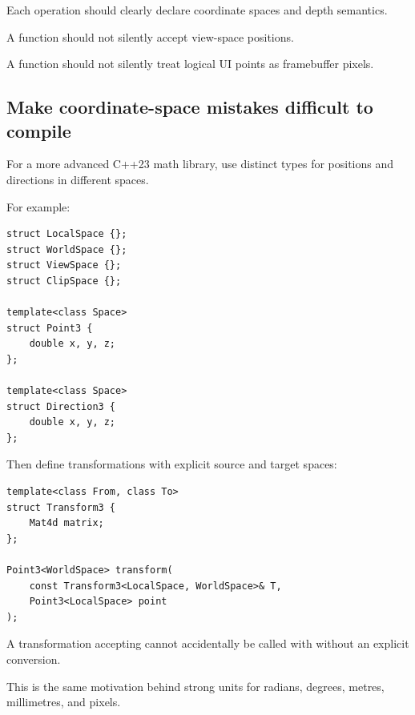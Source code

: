 Each operation should clearly declare coordinate spaces and depth semantics.

A  function should not silently accept view-space positions.

A  function should not silently treat logical UI points as framebuffer pixels.

\subsection{Make coordinate-space mistakes difficult to compile}\label{02-foundations-ii-ch037-make-coordinate-space-mistakes-difficult-to-compile}

\hypertarget{02-foundations-ii-ch037-make-coordinate-space-mistakes-difficult-to-compile}{}

For a more advanced C++23 math library, use distinct types for positions and directions in different spaces.

For example:

\begin{verbatim}
struct LocalSpace {};
struct WorldSpace {};
struct ViewSpace {};
struct ClipSpace {};

template<class Space>
struct Point3 {
    double x, y, z;
};

template<class Space>
struct Direction3 {
    double x, y, z;
};
\end{verbatim}

Then define transformations with explicit source and target spaces:

\begin{verbatim}
template<class From, class To>
struct Transform3 {
    Mat4d matrix;
};

Point3<WorldSpace> transform(
    const Transform3<LocalSpace, WorldSpace>& T,
    Point3<LocalSpace> point
);
\end{verbatim}

A transformation accepting  cannot accidentally be called with  without an explicit conversion.

This is the same motivation behind strong units for radians, degrees, metres, millimetres, and pixels.

